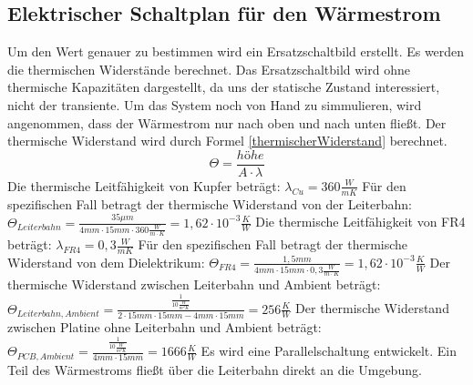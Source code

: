 \documentclass[10pt,a4paper,oneside,abstracton]{scrartcl}
\begin{document}
\begin{multicols}{2}
\subsection{Elektrischer Schaltplan für den Wärmestrom }
Um den Wert genauer zu bestimmen wird ein Ersatzschaltbild erstellt.
Es werden die thermischen Widerstände berechnet. 
Das Ersatzschaltbild wird ohne thermische Kapazitäten dargestellt, da uns der statische Zustand interessiert, nicht der transiente.
Um das System noch von Hand zu simmulieren, wird angenommen, dass der Wärmestrom nur nach oben und nach unten fließt. 
Der thermische Widerstand wird durch Formel \ref*{thermischerWiderstand} berechnet. 
\begin{equation}
	\Theta =  \frac{höhe}{A \cdot \lambda}
	\label{thermischerWiderstand}
\end{equation}
\newline \noindent
Die thermische Leitfähigkeit von Kupfer beträgt:  \newline 
$\lambda_{Cu} = 360 \frac{W}{m K}$  \cite{Waermefluss} \newline
Für den spezifischen Fall betragt der thermische Widerstand von der Leiterbahn:  \newline
$\Theta_{Leiterbahn} = \frac{35 \mu m}{4mm \cdot 15mm \cdot 360 \frac{W}{m\cdot K}} = 1,62\cdot 10^{-3} \frac{K}{W}$
\newline \noindent
Die thermische Leitfähigkeit von FR4 beträgt: 
\newline
 $\lambda_{FR4} = 0,3 \frac{W}{m K}$ \cite{Waermefluss} \newline
Für den spezifischen Fall betragt der thermische Widerstand von dem Dielektrikum: 
\newline
$\Theta_{FR4} = \frac{1,5 mm}{4mm \cdot 15mm \cdot 0,3 \frac{W}{m\cdot K}} = 1,62\cdot 10^{-3} \frac{K}{W}$
\newline
Der thermische Widerstand zwischen Leiterbahn und Ambient beträgt: 
\newline
$\Theta_{Leiterbahn, Ambient} = \frac{\frac{1}{10 \frac{W}{m^2K}}}{ 2\cdot 15mm \cdot 15mm - 4mm \cdot 15mm} = 256 \frac{K}{W} $
\newline
Der thermische Widerstand zwischen Platine ohne Leiterbahn und Ambient beträgt: 
\newline
$\Theta_{PCB, Ambient} = \frac{\frac{1}{10 \frac{W}{m^2K}}}{  4mm \cdot 15mm} = 1666 \frac{K}{W} $
\newline
Es wird eine Parallelschaltung entwickelt. 
\newline
Ein Teil des Wärmestroms fließt über die Leiterbahn direkt an die Umgebung. 

\end{multicols}
\end{document}
